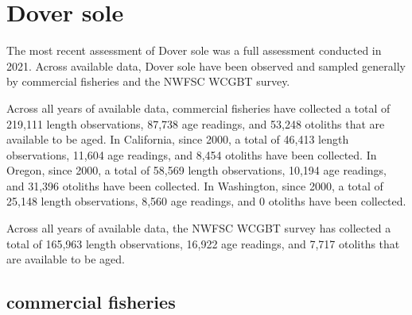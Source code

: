 \documentclass[11pt,
  english,
  letterpaper,
]{article}
\begin{document}

\hypertarget{dover-sole}{%
\section{Dover sole}\label{dover-sole}}

\leavevmode\tagmcend\tagstructend


The most recent assessment of Dover sole was a full assessment conducted in 2021. Across available data, Dover sole have been observed and sampled generally by commercial fisheries and the NWFSC WCGBT survey.

\leavevmode\tagmcend\tagstructend\par


Across all years of available data, commercial fisheries have collected a total of 219,111 length observations, 87,738 age readings, and 53,248 otoliths that are available to be aged. In California, since 2000, a total of 46,413 length observations, 11,604 age readings, and 8,454 otoliths have been collected. In Oregon, since 2000, a total of 58,569 length observations, 10,194 age readings, and 31,396 otoliths have been collected. In Washington, since 2000, a total of 25,148 length observations, 8,560 age readings, and 0 otoliths have been collected.

\leavevmode\tagmcend\tagstructend\par


Across all years of available data, the NWFSC WCGBT survey has collected a total of 165,963 length observations, 16,922 age readings, and 7,717 otoliths that are available to be aged.

\leavevmode\tagmcend\tagstructend\par


\hypertarget{commercial-fisheries-18}{%
\subsection{commercial fisheries}\label{commercial-fisheries-18}}

\leavevmode\tagmcend\tagstructend

\end{document}
